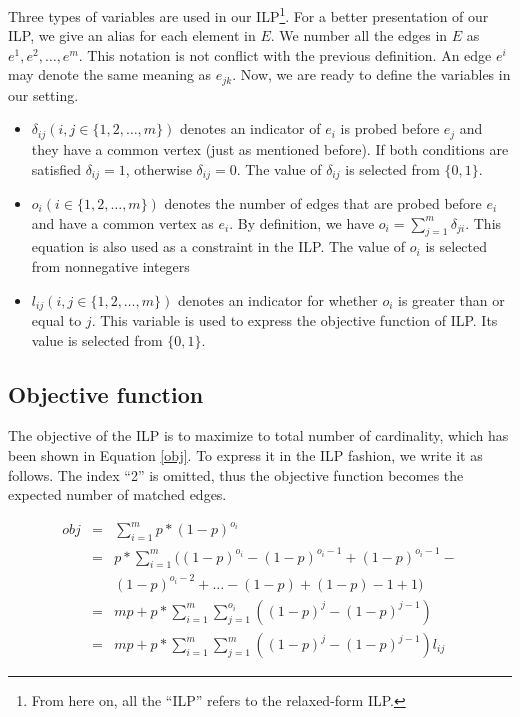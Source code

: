 \documentclass[letterpaper]{article}
\begin{document}
Three types of variables are used in our ILP\footnote{From here on, all the ``ILP'' refers to the relaxed-form ILP.}.
For a better presentation of our ILP, we give an alias for each element in $E$.
We number all the edges in $E$ as $e^1,e^2,\ldots,e^m$.
This notation is not conflict with the previous definition.
An edge $e^i$ may denote the same meaning as $e_{jk}$.
Now, we are ready to define the variables in our setting.
\begin{itemize}
	\item $\delta_{ij}(i,j\in\{1,2,\ldots,m\})$ denotes an indicator of $e_i$ is probed before $e_j$ and they have a common vertex (just as mentioned before). If both conditions are satisfied $\delta_{ij}=1$, otherwise $\delta_{ij}=0$. The value of $\delta_{ij}$ is selected from $\{0,1\}$.
	\item $o_i(i\in\{1,2,\ldots,m\})$ denotes the number of edges that are probed before $e_i$ and have a common vertex as $e_i$. By definition, we have $o_i=\sum_{j=1}^{m}\delta_{ji}$. This equation is also used as a constraint in the ILP. The value of $o_i$ is selected from nonnegative integers
	\item $l_{ij}(i,j\in\{1,2,\ldots,m\})$ denotes an indicator for whether $o_i$ is greater than or equal to $j$. This variable is used to express the objective function of ILP. Its value is selected from $\{0,1\}$.
\end{itemize}

\subsection{Objective function}

The objective of the ILP is to maximize to total number of cardinality, which has been shown in Equation \ref{obj}.
To express it in the ILP fashion, we write it as follows. The index ``2'' is omitted, thus the objective function becomes the expected number of matched edges.

\begin{eqnarray}
	obj&=&\sum_{i=1}^{m}p*(1-p)^{o_i}\label{simple}\\
	&= & p*\sum_{i=1}^{m} ((1-p)^{o_i}-(1-p)^{o_{i}-1}+(1-p)^{o_{i}-1}-\nonumber\\
	&&(1-p)^{o_{i}-2}+\ldots-(1-p)+(1-p)-1+1)\\
	&=& mp+p*\sum_{i=1}^{m}\sum_{j=1}^{o_i}((1-p)^j-(1-p)^{j-1})\\
	&=& mp+p*\sum_{i=1}^{m}\sum_{j=1}^{m}((1-p)^j-(1-p)^{j-1})l_{ij}\label{fobj}
\end{eqnarray}
\end{document}

